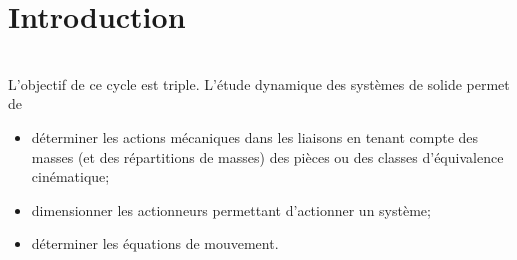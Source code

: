 \def\xxactivite{Cours}

\fichefalse
\proftrue
\tdfalse
\courstrue


\def\xxnumchapitre{Chapitre 1 \vspace{.2cm}}
\def\xxchapitre{\hspace{.12cm} Résolution des problèmes de dynamique plans à 1 mobilité}

\def\xxcompetences{%
\textsl{%
\textbf{Savoirs et compétences :}
\begin{itemize}[label=\ding{112},font=\color{bleuxp}] 
\item \textit{C1-05} : Proposer une démarche permettant la détermination d’une action mécanique inconnue ou d'une loi de mouvement.
\item \textit{C2-08} : Déterminer les actions mécaniques en dynamique dans le cas où le mouvement est imposé.
\item \textit{C2-09} : Déterminer la loi de mouvement dans le cas où les efforts extérieurs sont connus.
\end{itemize}
}}

\def\xxfigures{
}%

\iflivret

\else

\fi

\setlength{\columnseprule}{.1pt}

\vspace{2cm}
\pagestyle{fancy}
\thispagestyle{plain}





\section{Introduction}
\begin{obj} ~\\
L'objectif de ce cycle est triple. L'étude dynamique des systèmes de solide permet de 
\begin{itemize}
\item déterminer les actions mécaniques dans les liaisons en tenant compte des masses (et des répartitions de masses) des pièces ou des classes d'équivalence cinématique;
\item dimensionner les actionneurs permettant d'actionner un système; 
\item déterminer les équations de mouvement.
\end{itemize}
\end{obj}



